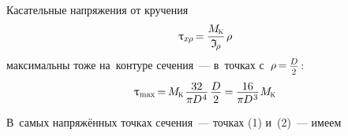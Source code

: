 \documentclass[14pt]{extarticle}
\begin{document}
Касательные напряжения от кручения
\[
\uptau_{\scalebox{.8}{$x \hspace{-.1ex} \rho$}} \hspace{-0.25ex}=\hspace{-0.1ex}
\displaystyle\frac{M_{\hspace{-0.1ex}\mathrm{\scalebox{.6}{K}}}}{\mathfrak{I}_{\hspace{-0.2ex}\scalebox{.8}{$\rho$}}} \hspace{.25ex} \rho
\]
максимальны тоже на~контуре сечения~--- в~точках с~${\hspace{.1ex}\rho \hspace{-.2ex}=\hspace{-.15ex} \scalebox{.82}{$ \displaystyle\frac{\raisebox{-.2em}{$D$}}{2} $}\hspace{.2ex}}$:
\[
\uptau_{\scalebox{.75}{max}} \hspace{-.25ex}
= \hspace{-.2ex} M_{\hspace{-0.1ex}\mathrm{\scalebox{.6}{K}}}\hspace{.2ex}
\displaystyle\frac{\raisebox{-.2em}{$32$}}{\pi \hspace{-0.1ex} D^{\hspace{.1ex}4}} \hspace{.25ex} \displaystyle\frac{\raisebox{-.2em}{$D$}}{2}
\hspace{-.1ex}= \hspace{-.1ex}
\displaystyle\frac{\raisebox{-.2em}{$16$}}{\pi \hspace{-0.1ex} D^{\hspace{.1ex}3}} \hspace{.1ex}
M_{\hspace{-0.1ex}\mathrm{\scalebox{.6}{K}}}
\]

\vspace{.2cm}
В~самых напряжённых точках сечения~--- точках (1) и~(2)~--- имеем
\vspace{.2cm}

\def\sideofcube{1.5}
\def\showcoordinatelength{3}
\end{document}
